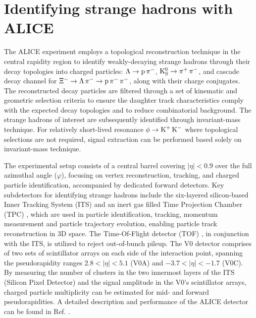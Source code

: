 \section{Identifying strange hadrons with ALICE}

The ALICE experiment employs a topological reconstruction technique in the central rapidity region to identify weakly-decaying strange hadrons through their 
decay topologies into charged particles: $\Lambda \rightarrow \textnormal{p}\, \pi^{-}$, 
$\mathrm{K_S^0} \rightarrow \pi^{+}\, \pi^{-}$, and cascade decay channel for $\Xi^{-} \rightarrow \Lambda\, \pi^{-} \rightarrow \textnormal{p}\, \pi^{-}\, \pi^{-}$,
along with their charge conjugates. The reconstructed decay particles are filtered through a set of kinematic and geometric selection criteria to ensure 
the daughter track characteristics comply with the expected decay topologies and to reduce combinatorial background. The strange hadrons of interest 
are subsequently identified through invariant-mass technique. For relatively short-lived resonance $\phi \rightarrow \textnormal{K}^{+}\, \textnormal{K}^{-}$ where 
topological selections are not required, signal extraction can be performed based solely on invariant-mass technique. 

The experimental setup consists of a central barrel covering $|\eta| < 0.9$ over the full azimuthal angle ($\varphi$), 
focusing on vertex reconstruction, tracking, and charged particle identification, accompanied by dedicated forward detectors.
Key subdetectors for identifying strange hadrons include the six-layered silicon-based Inner Tracking System (ITS) \cite{ITS:2014} and an inert 
gas filled Time Projection Chamber (TPC) \cite{TPC:2014}, which are used in particle identification, tracking, momentum measurement and particle 
trajectory evolution, enabling particle track reconstruction in 3D space. The Time-Of-Flight detector (TOF) \cite{TOF:2019}, in conjunction with the 
ITS, is utilized to reject out-of-bunch pileup. The V0 detector \cite{V0:2013} comprises of two sets of scintillator arrays on each side of the 
interaction point, spanning the pseudorapidity ranges $2.8 < |\eta| < 5.1$ (V0A) and $-3.7 < |\eta| < -1.7$ (V0C). By measuring the number of 
clusters in the two innermost layers of the ITS (Silicon Pixel Detector) and the signal amplitude in the V0's scintillator arrays, charged 
particle multiplicity can be estimated for mid- and forward pseudorapidities. A detailed description and performance of the ALICE detector can 
be found in Ref. \cite{AlicePerf:2014}.